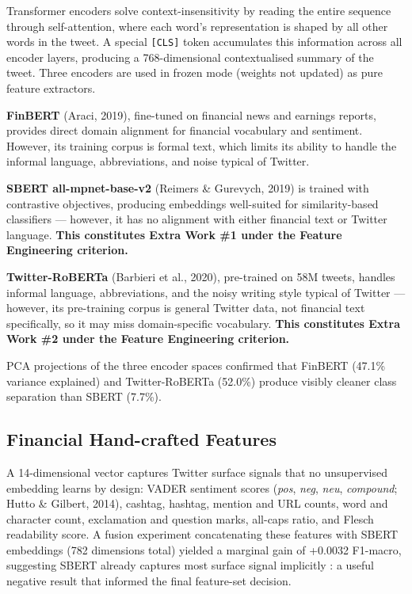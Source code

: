 \documentclass[11pt,a4paper]{article}
\begin{document}
Transformer encoders solve context-insensitivity by reading the entire sequence through
self-attention, where each word's representation is shaped by all other words in the tweet.
A special \texttt{[CLS]} token accumulates this information across all encoder layers, producing
a 768-dimensional contextualised summary of the tweet. Three encoders
are used in frozen mode (weights not updated) as pure feature extractors.

\textbf{FinBERT} (Araci, 2019), fine-tuned on financial news and earnings reports, provides
direct domain alignment for financial vocabulary and sentiment. However, its training corpus
is formal text, which limits its ability to handle the informal language, abbreviations, and
noise typical of Twitter.

\textbf{SBERT all-mpnet-base-v2} (Reimers \& Gurevych, 2019) is trained with contrastive
objectives, producing embeddings well-suited for similarity-based classifiers — however, it
has no alignment with either financial text or Twitter language.
\textbf{This constitutes Extra Work \#1 under the Feature Engineering criterion.}

\textbf{Twitter-RoBERTa} (Barbieri et al., 2020), pre-trained on 58M tweets, handles informal
language, abbreviations, and the noisy writing style typical of Twitter — however, its
pre-training corpus is general Twitter data, not financial text specifically, so it may miss
domain-specific vocabulary.
\textbf{This constitutes Extra Work \#2 under the Feature Engineering criterion.}

PCA projections of the three encoder spaces confirmed that FinBERT (47.1\% variance explained)
and Twitter-RoBERTa (52.0\%) produce visibly cleaner class separation than SBERT (7.7\%).

\subsection{Financial Hand-crafted Features}

A 14-dimensional vector captures Twitter surface signals that no unsupervised embedding learns
by design: VADER sentiment scores (\textit{pos}, \textit{neg}, \textit{neu}, \textit{compound};
Hutto \& Gilbert, 2014), cashtag, hashtag, mention and URL counts, word and character count,
exclamation and question marks, all-caps ratio, and Flesch readability score. A fusion
experiment concatenating these features with SBERT embeddings (782 dimensions total) yielded
a marginal gain of +0.0032 F1-macro, suggesting SBERT already captures most surface signal
implicitly : a useful negative result that informed the final feature-set decision.
\end{document}
